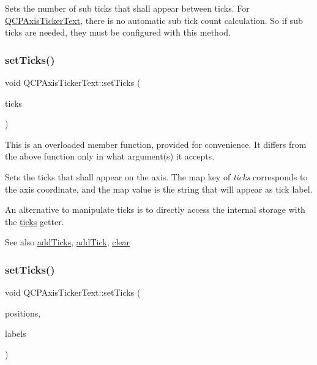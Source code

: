 Sets the number of sub ticks that shall appear between ticks. For \hyperlink{class_q_c_p_axis_ticker_text}{Q\+C\+P\+Axis\+Ticker\+Text}, there is no automatic sub tick count calculation. So if sub ticks are needed, they must be configured with this method. \mbox{\label{class_q_c_p_axis_ticker_text_a8cdf1f21940f1f53f5e3d30b2c74f5cf}} 
\subsubsection{\texorpdfstring{set\+Ticks()}{setTicks()}\hspace{0.1cm}{\footnotesize\ttfamily [1/2]}}
{\footnotesize\ttfamily void Q\+C\+P\+Axis\+Ticker\+Text\+::set\+Ticks (\begin{DoxyParamCaption}\item[{const Q\+Map$<$ double, Q\+String $>$ \&}]{ticks }\end{DoxyParamCaption})}

This is an overloaded member function, provided for convenience. It differs from the above function only in what argument(s) it accepts.

Sets the ticks that shall appear on the axis. The map key of {\itshape ticks} corresponds to the axis coordinate, and the map value is the string that will appear as tick label.

An alternative to manipulate ticks is to directly access the internal storage with the \hyperlink{class_q_c_p_axis_ticker_text_ac84622a6bb4f2a98474e185ecaf3189a}{ticks} getter.

\begin{DoxySeeAlso}{See also}
\hyperlink{class_q_c_p_axis_ticker_text_aba34051300eecaefbedb2df8feff2d45}{add\+Ticks}, \hyperlink{class_q_c_p_axis_ticker_text_aada3db69e5fc6585aaa4ea5d89552eb0}{add\+Tick}, \hyperlink{class_q_c_p_axis_ticker_text_a21826d2fcd9a25c194d34d4f67aa1460}{clear} 
\end{DoxySeeAlso}
\mbox{\label{class_q_c_p_axis_ticker_text_a69f3898cc1cf11d2437851f959faa1e8}} 
\subsubsection{\texorpdfstring{set\+Ticks()}{setTicks()}\hspace{0.1cm}{\footnotesize\ttfamily [2/2]}}
{\footnotesize\ttfamily void Q\+C\+P\+Axis\+Ticker\+Text\+::set\+Ticks (\begin{DoxyParamCaption}\item[{const Q\+Vector$<$ double $>$ \&}]{positions,  }\item[{const Q\+Vector$<$ Q\+String $>$}]{labels }\end{DoxyParamCaption})}

